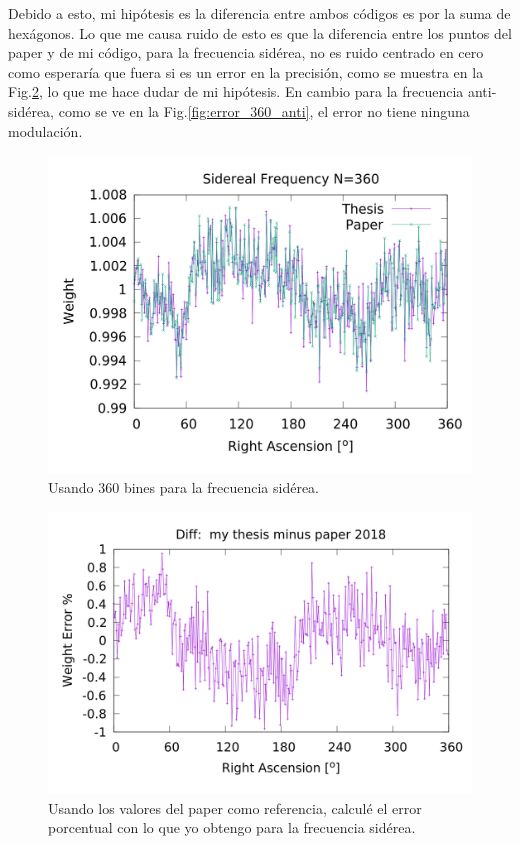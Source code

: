 	Debido a esto, mi hipótesis es la diferencia entre ambos códigos es por la suma de hexágonos. Lo que me causa ruido de esto es que la diferencia entre los puntos del paper y de mi código, para la frecuencia sidérea,  no es ruido centrado en cero como esperaría que fuera si es un error en la precisión, como se muestra en la Fig.\ref{fig:error_360_sid}, lo que me hace dudar de mi hipótesis. En cambio para la frecuencia anti-sidérea, como se ve en la Fig.\ref{fig:error_360_anti}, el error no tiene ninguna modulación.

	\begin{figure}[H]
	\centering
	\includegraphics[width=0.8\linewidth]{Graficos/sidereal_my_and_paper_in_360.png}
	\caption{Usando 360 bines para la frecuencia sidérea.}
	\label{fig:sid_360}
	\end{figure}


	\begin{figure}[H]
	\centering
	\includegraphics[width=0.8\linewidth]{Graficos/sidereal_my_and_paper_in_360_error.png}
	\caption{Usando los valores del paper como referencia, calculé el error porcentual con lo que yo obtengo para la frecuencia sidérea.}
	\label{fig:error_360_sid}
	\end{figure}



